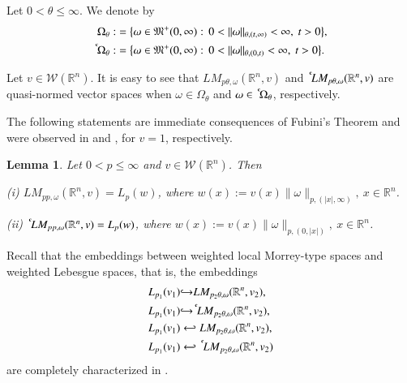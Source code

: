 \documentclass[11pt]{amsart}
\theoremstyle{plain}
\newtheorem{lem}[thm]{Lemma}
\theoremstyle{definition}
\numberwithin{thm}{section}
\numberwithin{equation}{section}
\begin{document}
Let $0< {\theta} \le {\infty}$. We denote by
\begin{align*}
{\Omega_{\theta}} : & = \big\{{\omega} \in {{\mathfrak M}}^+ {(0,{\infty})}:\, 0<\|{\omega}\|_{{\theta},(t,{\infty})}<{\infty},~ t>0 \big\}, \\
{{\,^{^{\bf c}}\!}{\Omega_{\theta}}} : & = \big\{{\omega} \in {{\mathfrak M}}^+ {(0,{\infty})}:\,0<\|{\omega}\|_{{\theta},(0,t)}<{\infty},~ t>0 \big\}.	
\end{align*}

Let $v \in {{\mathcal W}}({{\mathbb R}^n})$. It is easy to see that ${LM_{p{\theta},{\omega}}({{\mathbb R}^n},v)}$ and ${{\,^{^{\bf c}}\!}{LM_{p{\theta},{\omega}}({{\mathbb R}^n},v)}}$ are
quasi-normed vector spaces when ${\omega} \in {\Omega_{\theta}}$ and ${\omega} \in {{\,^{^{\bf c}}\!}{\Omega_{\theta}}}$,
respectively.

The following statements are immediate consequences of Fubini's Theorem and were observed in \cite{BurHus1} and \cite{BurGulHus1}, for $v = 1$, respectively. 
\begin{lem}\label{LMpp}
	Let $0 < p \leq \infty$ and $v\in {{\mathcal W}}({{\mathbb R}^n})$. Then 
	
	{\rm (i)} $LM_{pp,{\omega}}({{\mathbb R}^n},v)=L_p(w)$, where	$w(x) := v(x)\|{\omega}\|_{p,(|x|,\infty)}, ~ x \in {{\mathbb R}^n}$.
	
	{\rm (ii)} ${\,^{^{\bf c}}\!} LM_{pp,{\omega}}({{\mathbb R}^n},v)=L_p(w)$, where	$w(x) := v(x)\|{\omega}\|_{p,(0,|x|)}, ~ x \in {{\mathbb R}^n}$.
\end{lem}

Recall that the embeddings between weighted local Morrey-type spaces and weighted Lebesgue spaces, that
is, the embeddings 
\begin{align}
L_{p_1}(v_1) & {\hookrightarrow} LM_{p_2 {\theta}, {\omega}}({{\mathbb R}^n},v_2), \label{emb1}\\
L_{p_1}(v_1) & {\hookrightarrow} {\,^{^{\bf c}}\!}{LM}_{p_2 {\theta}, {\omega}}({{\mathbb R}^n},v_2), \label{emb2}\\
L_{p_1}(v_1) & \hookleftarrow LM_{p_2{\theta}, {\omega}}({{\mathbb R}^n},v_2), \label{emb3}\\
L_{p_1}(v_1) & \hookleftarrow {\,^{^{\bf c}}\!}{LM}_{p_2 {\theta}, {\omega}}({{\mathbb R}^n},v_2)
\label{emb4}
\end{align}
are completely characterized in \cite{mu_emb}.
\end{document}

